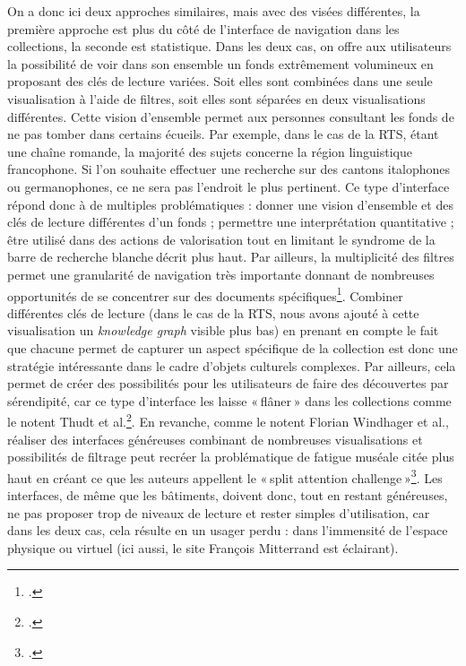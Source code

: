 On a donc ici deux approches similaires, mais avec des visées différentes, la première approche est plus du côté de l’interface de navigation dans les collections, la seconde est statistique. Dans les deux cas, on offre aux utilisateurs la possibilité de voir dans son ensemble un fonds extrêmement volumineux en proposant des clés de lecture variées. Soit elles sont combinées dans une seule visualisation à l’aide de filtres, soit elles sont séparées en deux visualisations différentes. Cette vision d'ensemble permet aux personnes consultant les fonds de ne pas tomber dans certains écueils. Par exemple, dans le cas de la RTS, étant une chaîne romande, la majorité des sujets concerne la région linguistique francophone. Si l'on souhaite effectuer une recherche sur des cantons italophones ou germanophones, ce ne sera pas l'endroit le plus pertinent. Ce type d’interface répond donc à de multiples problématiques : donner une vision d’ensemble et des clés de lecture différentes d’un fonds ; permettre une interprétation quantitative ; être utilisé dans des actions de valorisation tout en limitant le syndrome de la barre de recherche blanche décrit plus haut. Par ailleurs, la multiplicité des filtres permet une granularité de navigation très importante donnant de nombreuses opportunités de se concentrer sur des documents spécifiques\footcite[p. 7]{windhager2018a}. Combiner différentes clés de lecture (dans le cas de la RTS, nous avons ajouté à cette visualisation un \textit{knowledge graph} visible plus bas) en prenant en compte le fait que chacune permet de capturer un aspect spécifique de la collection est donc une stratégie intéressante dans le cadre d’objets culturels complexes. Par ailleurs, cela permet de créer des possibilités pour les utilisateurs de faire des découvertes par sérendipité, car ce type d’interface les laisse « flâner » dans les collections comme le notent Thudt et al.\footcite[(cité dans)]{windhager2018a}. En revanche, comme le notent Florian Windhager et al., réaliser des interfaces généreuses combinant de nombreuses visualisations et possibilités de filtrage peut recréer la problématique de fatigue muséale citée plus haut en créant ce que les auteurs appellent le « split attention challenge »\footcite[p. 9]{windhager2018a}. Les interfaces, de même que les bâtiments, doivent donc, tout en restant généreuses, ne pas proposer trop de niveaux de lecture et rester simples d’utilisation, car dans les deux cas, cela résulte en un usager perdu : dans l’immensité de l’espace physique ou virtuel (ici aussi, le site François Mitterrand est éclairant).

